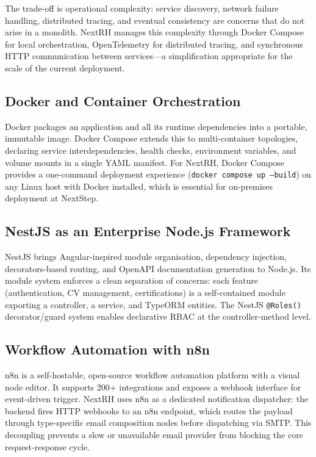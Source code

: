 \documentclass[12pt,a4paper,oneside,openany]{report}
\begin{document}
The trade-off is operational complexity: service discovery, network failure handling, distributed tracing, and eventual consistency are concerns that do not arise in a monolith. NextRH manages this complexity through Docker Compose for local orchestration, OpenTelemetry for distributed tracing, and synchronous \ac{HTTP} communication between services---a simplification appropriate for the scale of the current deployment.

\subsection{Docker and Container Orchestration}
Docker \cite{merkel2014docker} packages an application and all its runtime dependencies into a portable, immutable image. Docker Compose extends this to multi-container topologies, declaring service interdependencies, health checks, environment variables, and volume mounts in a single YAML manifest. For NextRH, Docker Compose provides a one-command deployment experience (\texttt{docker compose up --build}) on any Linux host with Docker installed, which is essential for on-premises deployment at NextStep.

\subsection{NestJS as an Enterprise Node.js Framework}
NestJS \cite{kamil2017nestjs} brings Angular-inspired module organisation, dependency injection, decorators-based routing, and OpenAPI documentation generation to Node.js. Its module system enforces a clean separation of concerns: each feature (authentication, CV management, certifications) is a self-contained module exporting a controller, a service, and TypeORM entities. The NestJS \texttt{@Roles()} decorator/guard system enables declarative \ac{RBAC} at the controller-method level.

\subsection{Workflow Automation with n8n}
n8n \cite{n8n2022} is a self-hostable, open-source workflow automation platform with a visual node editor. It supports 200+ integrations and exposes a webhook interface for event-driven trigger. NextRH uses n8n as a dedicated notification dispatcher: the backend fires HTTP webhooks to an n8n endpoint, which routes the payload through type-specific email composition nodes before dispatching via SMTP. This decoupling prevents a slow or unavailable email provider from blocking the core request-response cycle.
\end{document}
